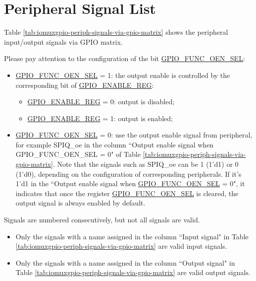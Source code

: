 \documentclass[main\_\_EN.tex]{subfiles}
\begin{document}
\section{Peripheral Signal List}
\label{sec:peripheral_signals}

Table \ref{tab:iomuxgpio-periph-signals-via-gpio-matrix} shows the peripheral input/output signals via GPIO matrix.

Please pay attention to the configuration of the bit \hyperref[fielddesc:GPIOFUNCNOENSEL]{GPIO\_FUNC\_OEN\_SEL}:

\begin{itemize}
    \item \hyperref[fielddesc:GPIOFUNCNOENSEL]{GPIO\_FUNC\_OEN\_SEL} = 1: the output enable is controlled by the corresponding bit  of \hyperref[regdesc:GPIOENABLEREG]{GPIO\_ENABLE\_REG}:
    \begin{itemize}
        \item \hyperref[regdesc:GPIOENABLEREG]{GPIO\_ENABLE\_REG} = 0: output is disabled;
        \item \hyperref[regdesc:GPIOENABLEREG]{GPIO\_ENABLE\_REG} = 1: output is enabled;
    \end{itemize}
    \item \hyperref[fielddesc:GPIOFUNCNOENSEL]{GPIO\_FUNC\_OEN\_SEL} = 0: use the output enable signal from peripheral, for example SPIQ\_oe in the column ``Output enable signal when GPIO\_FUNC\_OEN\_SEL = 0" of Table \ref{tab:iomuxgpio-periph-signals-via-gpio-matrix}. Note that the signals such as SPIQ\_oe can be 1 (1'd1) or 0 (1'd0), depending on the configuration of corresponding peripherals. If it's 1'd1 in the ``Output enable signal when \hyperref[fielddesc:GPIOFUNCNOENSEL]{GPIO\_FUNC\_OEN\_SEL} = 0", it indicates that once the register \hyperref[fielddesc:GPIOFUNCNOENSEL]{GPIO\_FUNC\_OEN\_SEL} is cleared, the output signal is always enabled by default.
\end{itemize}

\begin{tiplisting}
Signals are numbered consecutively, but not all signals are valid.
\vspace{-1em}
\begin{itemize}
    \item Only the signals with a name assigned in the column ``Input signal" in Table \ref{tab:iomuxgpio-periph-signals-via-gpio-matrix} are valid input signals.
    \item Only the signals with a name assigned in the column ``Output signal" in Table \ref{tab:iomuxgpio-periph-signals-via-gpio-matrix} are valid output signals.
\end{itemize}
\end{tiplisting}
\end{document}
